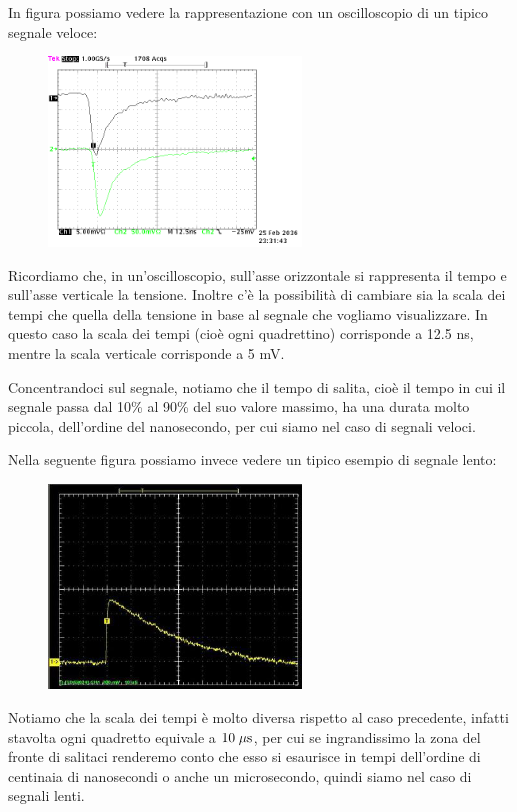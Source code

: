 \begin{esempio}
   In figura possiamo vedere la rappresentazione con un oscilloscopio di un tipico segnale veloce:
   \begin{figure}[H]
      \centering
      \includegraphics[width=0.6\textwidth]{immagini/esempio_segnale_veloce.png}
   \end{figure}
   Ricordiamo che, in un'oscilloscopio, sull'asse orizzontale si rappresenta il tempo e sull'asse verticale la tensione. Inoltre c'è la possibilità di cambiare sia la scala dei tempi che quella della tensione in base al segnale che vogliamo visualizzare. In questo caso la scala dei tempi (cioè ogni quadrettino) corrisponde a 12.5 ns, mentre la scala verticale corrisponde a 5 mV.
   
   Concentrandoci sul segnale, notiamo che il tempo di salita\footnotemark, cioè il tempo in cui il segnale passa dal 10\% al 90\% del suo valore massimo, ha una durata molto piccola, dell'ordine del nanosecondo, per cui siamo nel caso di segnali veloci.
\end{esempio}


\begin{esempio}
   Nella seguente figura possiamo invece vedere un tipico esempio di segnale lento:
   \begin{figure}[H]
      \centering
      \includegraphics[width=0.6\textwidth]{immagini/esempio_segnale_lento.png}
   \end{figure}
   Notiamo che la scala dei tempi è molto diversa rispetto al caso precedente, infatti stavolta ogni quadretto equivale a $10 \; \rm \mu s$, per cui se ingrandissimo la zona del fronte di salita\footnotemark ci renderemo conto che esso si esaurisce in tempi dell'ordine di centinaia di nanosecondi o anche un microsecondo, quindi siamo nel caso di segnali lenti.
\end{esempio}

